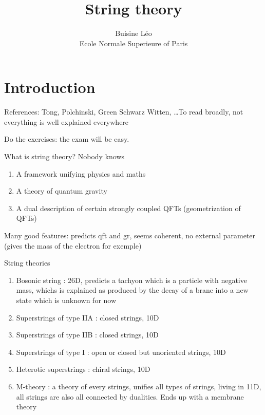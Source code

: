 \documentclass[a4paper]{book}
\theoremstyle{definition}
\theoremstyle{remark}
\begin{document}
\title{String theory}
\author{Buisine Léo\\Ecole Normale Superieure of Paris}
\maketitle

\tableofcontents

\chapter{Introduction}
References: Tong, Polchinski, Green Schwarz Witten, \dots To read broadly, not everything is well explained everywhere \newline 

Do the exercises: the exam will be easy. \par \medskip 

What is string theory? Nobody knows 
\begin{enumerate}
    \item A framework unifying physics and maths 
    \item A theory of quantum gravity 
    \item A dual description of certain strongly coupled QFTs (geometrization of QFTs)
\end{enumerate}

Many good features: predicts qft and gr, seems coherent, no external parameter (gives the mass of the electron for exemple) \par \medskip 

String theories 
\begin{enumerate}
    \item Bosonic string : 26D, predicts a tachyon which is a particle with negative mass, whichs is explained as produced by the decay of a brane into a new state which is unknown for now
    \item Superstrings of type IIA : closed strings, 10D
    \item Superstrings of type IIB : closed strings, 10D
    \item Superstrings of type I : open or closed but unoriented strings, 10D
    \item Heterotic superstrings : chiral strings, 10D
    \item M-theory : a theory of every strings, unifies all types of strings, living in 11D, all strings are also all connected by dualities. Ends up with a membrane theory
\end{enumerate}
\end{document}
